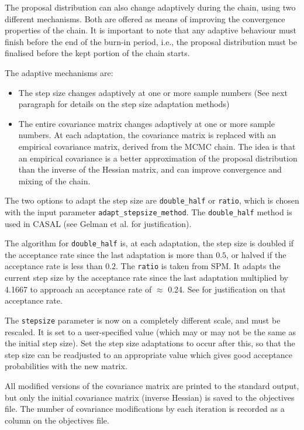 The proposal distribution can also change adaptively during the chain, using two different mechanisms. Both are offered as means of improving the convergence properties of the chain. It is important to note that any adaptive behaviour must finish before the end of the burn-in period, i.e., the proposal distribution must be finalised before the kept portion of the chain starts.

The adaptive mechanisms are:

\begin{itemize}
\item The step size changes adaptively at one or more sample numbers (See next paragraph for details on the step size adaptation methods)
\item The entire covariance matrix changes adaptively at one or more sample numbers. At each adaptation, the covariance matrix is replaced with an empirical covariance matrix, derived from the MCMC chain. The idea is that an empirical covariance is a better approximation of the proposal distribution than the inverse of the Hessian matrix, and can improve convergence and mixing of the chain.
\end{itemize}

The two options to adapt the step size are \texttt{double\_half} or \texttt{ratio}, which is chosen with the input parameter \texttt{adapt\_stepsize\_method}. The \texttt{double\_half} method is used in CASAL (see Gelman et al. \citep{823} for justification).

The algorithm for \texttt{double\_half} is, at each adaptation, the step size is doubled if the acceptance rate since the last adaptation is more than $0.5$, or halved if the acceptance rate is less than $0.2$. The \texttt{ratio} is taken from SPM. It adapts the current step size by the acceptance rate since the last adaptation multiplied by 4.1667 to approach an acceptance rate of $\approx$ 0.24. See \cite{mcmc_rate} for justification on that acceptance rate.

The \texttt{stepsize} parameter is now on a completely different scale, and must be rescaled. It is set to a user-specified value (which may or may not be the same as the initial step size). Set the step size adaptations to occur after this, so that the step size can be readjusted to an appropriate value which gives good acceptance probabilities with the new matrix.

All modified versions of the covariance matrix are printed to the standard output, but only the initial covariance matrix (inverse Hessian) is saved to the objectives file. The number of covariance modifications by each iteration is recorded as a column on the objectives file.


